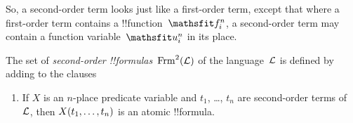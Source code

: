 \documentclass[../../../include/open-logic-section]{subfiles}
\begin{document}
\begin{explain}
So, a second-order term looks just like a first-order term, except
that where a first-order term contains a !!{function}~$\Obj{f^n_i}$, a
second-order term may contain a function variable~$\Obj{u^n_i}$ in its
place.
\end{explain}

\begin{defn}
The set of \emph{second-order !!{formula}s}~$\FrmSOL[L]$ of the
language~$\Lang L$ is defined by adding to
 the clauses
\begin{enumerate}
\item If $X$ is an $n$-place predicate variable and $t_1$, \dots,
  $t_n$ are second-order terms of~$\Lang L$, then
  $\mathord{X}(t_1,\ldots, t_n)$ is an atomic !!{formula}.




\end{enumerate}
\end{defn}
\end{document}
